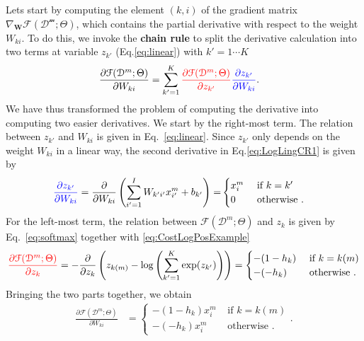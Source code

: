 Lets start by computing the element $(k,i)$ of the gradient matrix
$\nabla_\mathbf{W}\mathcal{F}(\mathcal{D^m};\Theta)$, which contains the partial
derivative with respect to the weight $W_{ki}$. To do this, we invoke the
\textbf{chain rule} to split the derivative calculation into two terms at
variable $z_{k'}$ (Eq.\ref{eq:linear}) with $k'=1\cdots K$
%
\begin{align}
\frac{\partial \mathcal{F}(\mathcal{D}^m;\Theta)}{\partial W_{ki}} & = \sum_{k'=1}^{K} { \color{red} \frac{\partial \mathcal{F}(\mathcal{D}^m;\Theta)}{\partial z_{k'}} }{ \color{blue} \frac{\partial z_{k'}}{\partial W_{ki}}}.
\label{eq:LogLingCR1}
\end{align}
%
We have thus transformed the problem of computing the derivative into computing
two easier derivatives. We start by the right-most term. The relation between
$z_{k'}$ and $W_{ki}$ is given in Eq.~\ref{eq:linear}. Since $z_{k'}$ only
depends on the weight $W_{ki}$ in a linear way, the second derivative in
Eq.\ref{eq:LogLingCR1} is given by
\begin{align}
{ \color{blue} \frac{\partial z_{k'}}{\partial W_{ki}}} = \frac{\partial }{\partial W_{ki}}\left(\sum_{i'=1}^{I} W_{k'i'} x^m_{i'} + b_{k'} \right) =
  &\begin{cases}
      x_i^m  &  \mbox{ if } k = k'\\
      0    &  \mbox{ otherwise }.
  \end{cases}
  \label{eq:partialLinear}
\end{align}
%
\noindent For the left-most term, the relation between $\mathcal{F}(\mathcal{D}^m;\Theta)$ and $z_k$ is given by Eq.~\ref{eq:softmax} together with \ref{eq:CostLogPosExample}
%
\begin{align}
{ \color{red} \frac{\partial \mathcal{F}(\mathcal{D}^m;\Theta)}{\partial z_{k}} }= - \frac{\partial }{\partial z_{k}}\left(z_{k(m)} - \log\left(\sum_{k'=1}^{K} \exp(z_{k'}) \right) \right) =
  \begin{cases}
      -(1 - h_k)  &  \mbox{ if } k = k(m)\\
      -(-h_k)     &  \mbox{ otherwise }.
  \end{cases}
  \label{eq:patialSoftmax}
\end{align}
%
Bringing the two parts together, we obtain
%
\begin{align}
\frac{\partial \mathcal{F}(\mathcal{D}^m;\Theta)}{\partial W_{ki}} & =
  \begin{cases}
      -(1 - h_k) x_i^m  &  \mbox{ if } k = k(m)\\
      -(-h_k) x_i^m     &  \mbox{ otherwise }.
  \end{cases}.
\label{eq:LogLingCR1}
\end{align}
%

